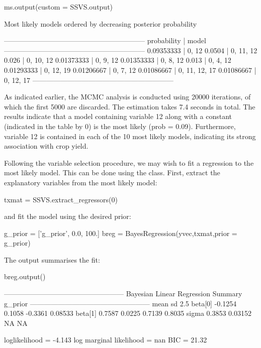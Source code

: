\documentclass[article]{jss}
\begin{document}
\begin{CodeChunk}
\begin{CodeInput}
ms.output(custom = SSVS.output)
\end{CodeInput}
\begin{CodeOutput}
Most likely models ordered by decreasing posterior probability

------------------------------------------------------------
probability | model       
------------------------------------------------------------
0.09353333  | 0, 12       
0.0504      | 0, 11, 12   
0.026       | 0, 10, 12   
0.01373333  | 0, 9, 12    
0.01353333  | 0, 8, 12    
0.013       | 0, 4, 12    
0.01293333  | 0, 12, 19   
0.01206667  | 0, 7, 12    
0.01086667  | 0, 11, 12, 17
0.01086667  | 0, 12, 17   
------------------------------------------------------------
\end{CodeOutput}
\end{CodeChunk}

As indicated earlier, the MCMC analysis is conducted using 20000
iterations, of which the first 5000 are discarded. The estimation
takes 7.4 seconds in total.  The results indicate that a model
containing variable 12 along with a constant (indicated in the table
by 0) is the most likely (prob = 0.09). Furthermore, variable 12 is
contained in each of the 10 most likely models, indicating its strong
association with crop yield.

Following the variable selection procedure, we may wish to fit a
regression to the most likely model. This can be done using the
 class. First, extract the explanatory variables
from the most likely model:
\begin{Code}
txmat = SSVS.extract_regressors(0)
\end{Code}
and fit the model using the desired prior:
\begin{Code}
g_prior = ['g_prior', 0.0, 100.]
breg = BayesRegression(yvec,txmat,prior = g_prior)
\end{Code}

The output summarises the fit:
\begin{CodeChunk}
\begin{CodeInput}
breg.output()
\end{CodeInput}
\begin{CodeOutput}
          ---------------------------------------------------           
                   Bayesian Linear Regression Summary                   
                                g_prior                                 
          ---------------------------------------------------           
                    mean          sd         2.5%
     beta[0]     -0.1254      0.1058      -0.3361     0.08533
     beta[1]      0.7587      0.0225       0.7139      0.8035
       sigma      0.3853     0.03152          NA         NA

loglikelihood = -4.143      
log marginal likelihood = nan         
BIC  = 21.32       
\end{CodeOutput}
\end{CodeChunk}
\end{document}
